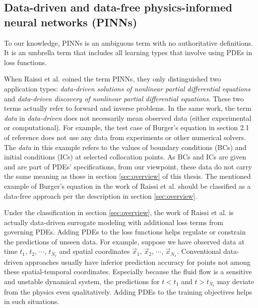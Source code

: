 \subsection*{Data-driven and data-free physics-informed neural networks (PINNs)}

To our knowledge, PINNs is an ambiguous term with no authoritative definitions.
It is an umbrella term that includes all learning types that involve using PDEs in loss functions.

When Raissi et al. \cite{raissi_physics-informed_2017,raissi_physics_2017,raissi_physics-informed_2019} coined the term PINNs, they only distinguished two application types: {\it data-driven solutions of nonlinear partial differential equations} and {\it data-driven discovery of nonlinear partial differential equations}.
These two terms actually refer to forward and inverse problems.
In the same work, the term {\it data} in {\it data-driven} does not necessarily mean observed data (either experimental or computational).
For example, the test case of Burger's equation in section 2.1 of reference \cite{raissi_physics-informed_2017} does not use any data from experiments or other numerical solvers.
The {\it data} in this example refers to the values of boundary conditions (BCs) and initial conditions (ICs) at selected collocation points.
As BCs and ICs are given and are part of PDEs' specifications, from our viewpoint, these data do not carry the same meaning as those in section \ref{sec:overview} of this thesis.
The mentioned example of Burger's equation in the work of Raissi et al. should be classified as a data-free approach per the description in section \ref{sec:overview}.

Under the classification in section \ref{sec:overview}, the work of Raissi et al. \cite{raissi_physics-informed_2017} is actually data-driven surrogate modeling with additional loss terms from governing PDEs.
Adding PDEs to the loss functions helps regulate or constrain the predictions of unseen data.
For example, suppose we have observed data at time $t_1$, $t_2$, $\cdots$, $t_{N_t}$ and spatial coordinates $\vec{x}_1$, $\vec{x}_2$, $\cdots$, $\vec{x}_{N_x}$. 
Conventional data-driven approaches usually have inferior prediction accuracy for points not among these spatial-temporal coordinates.
Especially because the fluid flow is a sensitive and unstable dynamical system, the predictions for $t < t_1$ and $t > t_{N_t}$ may deviate from the physics even qualitatively.
Adding PDEs to the training objectives helps in such situations.


